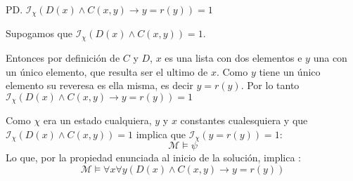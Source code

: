 \documentclass[8pt, letterpaper]{article}
\begin{document}
\begin{enumerate}
  PD. $\mathcal{I}_\chi(D(x)\land C(x,y)\rightarrow y = r(y)) = 1$

  \hfill\break
  Supogamos que $\mathcal{I}_\chi(D(x)\land C(x,y)) = 1$.

  Entonces por definición de $C$ y $D$, $x$ es una lista con dos
  elementos e $y$ una con un único elemento, que resulta ser
  el ultimo de $x$. Como $y$ tiene un único elemento
  su reveresa es ella misma, es decir $y = r(y)$.
  Por lo tanto $\mathcal{I}_\chi(D(x)\land C(x,y)\rightarrow y = r(y)) = 1$
  
  Como $\chi$ era un estado cualquiera, $y$ y $x$ constantes cualesquiera
  y que $\mathcal{I}_\chi(D(x)\land C(x,y)) = 1$ implica que
  $\mathcal{I}_\chi(y = r(y)) = 1$:
  $$\mathcal{M} \models \psi$$
  Lo que, por la propiedad enunciada al inicio de la solución, implica :
  $$\mathcal{M} \models \forall x\forall y(D(x)\land C(x,y)\rightarrow y = r(y))$$
\end{enumerate}
\end{document}
